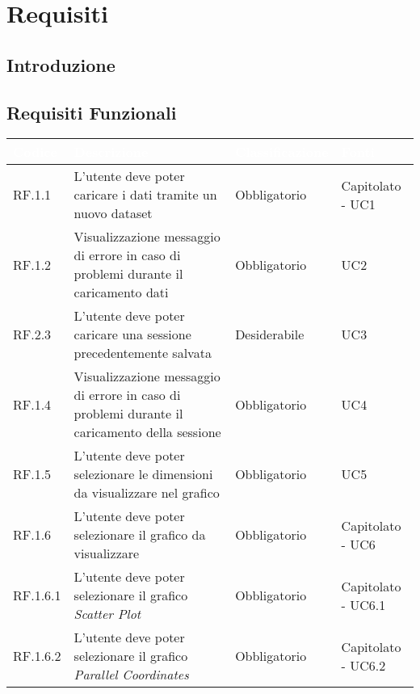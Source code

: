 \chapter{Requisiti}

\renewcommand\arraystretch{1,5}

\section{Introduzione}
\section{Requisiti Funzionali}

\begin{center}
  \centering
  \begin{longtable}{|L{1,5cm}|C{5,5cm}|C{3cm}|C{2cm}|}
    \hline
    \textcolor[HTML]{FFFFFF}{\textbf{Codice}} & \textcolor[HTML]{FFFFFF}{\textbf{Descrizione}} & \textcolor[HTML]{FFFFFF}{\textbf{Classificazione}} & \textcolor[HTML]{FFFFFF}{\textbf{Fonti}}
    \\ \hline
    RF.1.1 & L'utente deve poter caricare i dati tramite un nuovo dataset & Obbligatorio & Capitolato - UC1 \\ \hline
    RF.1.2 & Visualizzazione messaggio di errore in caso di problemi durante il caricamento dati & Obbligatorio & UC2 \\ \hline
    RF.2.3 & L'utente deve poter caricare una sessione precedentemente salvata & Desiderabile & UC3 \\ \hline
    RF.1.4 & Visualizzazione messaggio di errore in caso di problemi durante il caricamento della sessione & Obbligatorio & UC4 \\ \hline
    RF.1.5 & L'utente deve poter selezionare le dimensioni da visualizzare nel grafico & Obbligatorio & UC5 \\ \hline
    RF.1.6 & L'utente deve poter selezionare il grafico da visualizzare & Obbligatorio & Capitolato - UC6 \\ \hline
    RF.1.6.1 & L'utente deve poter selezionare il grafico \textit{Scatter Plot} & Obbligatorio & Capitolato - UC6.1 \\ \hline
    RF.1.6.2 & L'utente deve poter selezionare il grafico \textit{Parallel Coordinates} & Obbligatorio & Capitolato - UC6.2 \\ \hline

\end{longtable}
\end{center}
